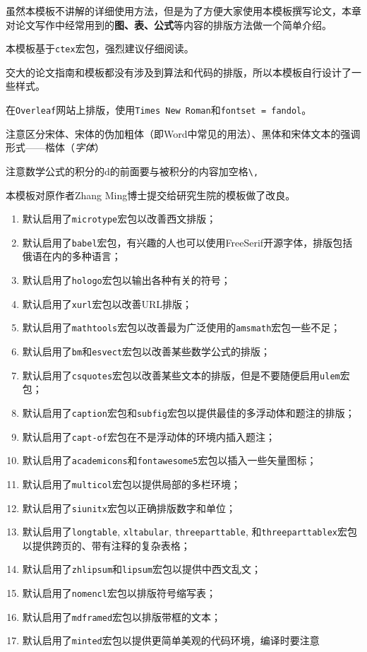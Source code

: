 

虽然本模板不讲解的详细使用方法，但是为了方便大家使用本模板撰写论文，本章对论文写作中经常用到的{\bfseries 图、表、公式}等内容的排版方法做一个简单介绍。

\begin{mdframed}
本模板基于\texttt{ctex}宏包，强烈建议仔细阅读。

交大的论文指南和模板都没有涉及到算法和代码的排版，所以本模板自行设计了一些样式。

在\texttt{Overleaf}网站上排版，使用\texttt{Times New Roman}和\texttt{fontset = fandol}。

注意区分宋体、宋体的伪加粗体（即Word中常见的用法）、黑体和宋体文本的强调形式——楷体（\emph{字体}）

注意数学公式的积分的$\mathrm{d}$的前面要与被积分的内容加空格\verb|\,|

本模板对原作者Zhang Ming博士提交给研究生院的模板做了改良。
\begin{enumerate}
  \item 默认启用了\texttt{microtype}宏包以改善西文排版；
  \item 默认启用了\texttt{babel}宏包，有兴趣的人也可以使用FreeSerif开源字体，排版包括俄语在内的多种语言；
  \item 默认启用了\texttt{hologo}宏包以输出各种有关的符号；
  \item 默认启用了\texttt{xurl}宏包以改善URL排版；
  \item 默认启用了\texttt{mathtools}宏包以改善最为广泛使用的\texttt{amsmath}宏包一些不足；
  \item 默认启用了\texttt{bm}和\texttt{esvect}宏包以改善某些数学公式的排版；
  \item 默认启用了\texttt{csquotes}宏包以改善某些文本的排版，但是不要随便启用\texttt{ulem}宏包；
  \item 默认启用了\texttt{caption}宏包和\texttt{subfig}宏包以提供最佳的多浮动体和题注的排版；
  \item 默认启用了\texttt{capt-of}宏包在不是浮动体的环境内插入题注；
  \item 默认启用了\texttt{academicons}和\texttt{fontawesome5}宏包以插入一些矢量图标；
  \item 默认启用了\texttt{multicol}宏包以提供局部的多栏环境；
  \item 默认启用了\texttt{siunitx}宏包以正确排版数字和单位；
  \item 默认启用了\texttt{longtable}, \texttt{xltabular}, \texttt{threeparttable}, 和\texttt{threeparttablex}宏包以提供跨页的、带有注释的复杂表格；
  \item 默认启用了\texttt{zhlipsum}和\texttt{lipsum}宏包以提供中西文乱文；
  \item 默认启用了\texttt{nomencl}宏包以排版符号缩写表；
  \item 默认启用了\texttt{mdframed}宏包以排版带框的文本；
  \item 默认启用了\texttt{minted}宏包以提供更简单美观的代码环境，编译时要注意 
  

\end{enumerate}
\end{mdframed}

